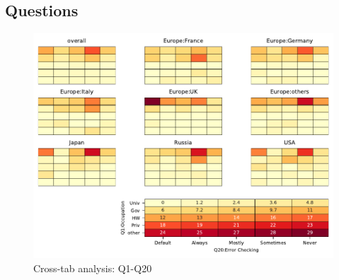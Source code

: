 
\subsection{Questions}


\begin{figure}
\begin{center}
\includegraphics[width=12cm]{../pdfs/Q1-Q20.pdf}
\caption{Cross-tab analysis: Q1-Q20}
\label{fig:Q1-Q20}
\end{center}
\end{figure}
